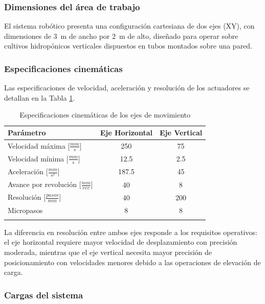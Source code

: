 \subsubsection{Dimensiones del área de trabajo}

El sistema robótico presenta una configuración cartesiana de dos ejes (XY), con dimensiones de 3~m de ancho por 2~m de alto, diseñado para operar sobre cultivos hidropónicos verticales dispuestos en tubos montados sobre una pared.

\subsubsection{Especificaciones cinemáticas}

Las especificaciones de velocidad, aceleración y resolución de los actuadores se detallan en la Tabla \ref{tab:esp_cinematicas}.

\begin{table}[htbp]
\centering
\begin{tabular}{|l|c|c|}
\hline
\textbf{Parámetro} & \textbf{Eje Horizontal} & \textbf{Eje Vertical} \\ \hline
Velocidad máxima [\(\frac{mm}{s}\)] & 250 & 75 \\ \hline
Velocidad mínima [\(\frac{mm}{s}\)] & 12.5 & 2.5 \\ \hline
Aceleración [\(\frac{mm}{s^2}\)] & 187.5 & 45 \\ \hline
Avance por revolución [\(\frac{mm}{rev}\)] & 40 & 8 \\ \hline
Resolución [\(\frac{pasos}{mm}\)] & 40 & 200 \\ \hline
Micropasos & 8 & 8 \\ \hline
\multicolumn{3}{c}{} \\
\end{tabular}
\caption{Especificaciones cinemáticas de los ejes de movimiento}
\label{tab:esp_cinematicas}
\end{table}

La diferencia en resolución entre ambos ejes responde a los requisitos operativos: el eje horizontal requiere mayor velocidad de desplazamiento con precisión moderada, mientras que el eje vertical necesita mayor precisión de posicionamiento con velocidades menores debido a las operaciones de elevación de carga.

\subsubsection{Cargas del sistema}

